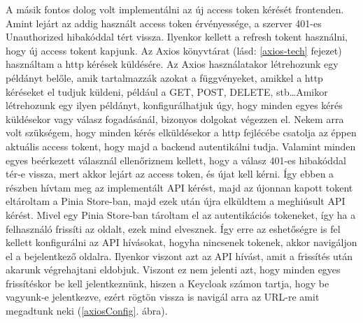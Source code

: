\documentclass[a4paper,twoside]{article}
\begin{document}
A másik fontos dolog volt implementálni az új access token kérését frontenden. Amint lejárt az addig használt access token érvényessége, a szerver 401-es Unauthorized 
hibakóddal tért vissza. Ilyenkor kellett a refresh tokent használni, hogy új access tokent kapjunk. Az Axios könyvtárat (lásd: \ref{axios-tech} fejezet) használtam a http kérések küldésére. Az Axios 
használatakor létrehozunk egy példányt belőle, amik tartalmazzák azokat a függvényeket, amikkel a http kéréseket el tudjuk küldeni, például a GET, POST, DELETE, stb\ldots Amikor létrehozunk egy ilyen példányt, konfigurálhatjuk úgy, hogy minden egyes kérés küldésekor vagy válasz fogadásánál, bizonyos dolgokat végezzen el. Nekem arra volt szükségem, hogy minden kérés elküldésekor a http fejlécébe csatolja az éppen aktuális access tokent, hogy majd a backend autentikálni tudja. Valamint minden egyes beérkezett válasznál ellenőriznem kellett, hogy a válasz 401-es hibakóddal tér-e vissza, mert akkor lejárt az access token, és újat kell kérni. Így ebben a részben hívtam meg az implementált API kérést, majd az újonnan kapott tokent eltároltam a Pinia Store-ban, majd ezek után újra elküldtem a meghiúsult API kérést. Mivel egy 
Pinia Store-ban tároltam el az autentikációs tokeneket, így ha a felhasználó frissíti az oldalt, ezek mind elvesznek. Így erre az eshetőségre is fel kellett konfigurálni az API hívásokat, hogyha nincsenek tokenek, akkor navigáljon el a bejelentkező oldalra. Ilyenkor viszont azt az API hívást, amit a frissítés után akarunk végrehajtani eldobjuk. Viszont ez nem jelenti azt, hogy minden egyes frissítéskor be kell jelentkeznünk, hiszen a Keycloak számon tartja, hogy be vagyunk-e jelentkezve, ezért rögtön vissza is navigál arra az URL-re amit megadtunk neki (\ref{axiosConfig}. ábra).
\end{document}
